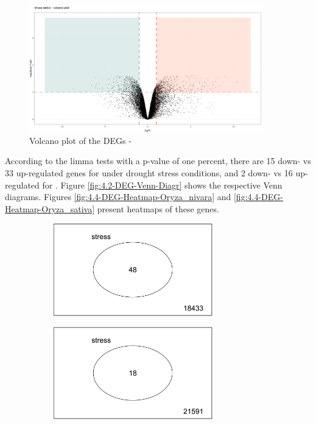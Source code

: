 \begin{figure}[htbp]
    \caption{Volcano plot of the DEGs - }
    \label{fig:4.1-DEG-Volcano-Plot-Oryza_sativa}
    \includegraphics[width=0.9\textwidth]{../../results/plots-and-tables/4.1-DEG-Volcano-Plot-Oryza_sativa}
\end{figure}

According to the limma tests with a p-value of one percent, there are 15 down- vs 33 up-regulated genes for  under drought stress conditions, and 2 down- vs 16 up-regulated for . Figure \ref{fig:4.2-DEG-Venn-Diagr} shows the respective Venn diagrams. Figures \ref{fig:4.4-DEG-Heatmap-Oryza_nivara} and \ref{fig:4.4-DEG-Heatmap-Oryza_sativa} present heatmaps of these genes.

\begin{figure}[htbp]
    \caption{Venn diagrams of the DEGs}
    \label{fig:4.2-DEG-Venn-Diagr}
    \begin{subfigure}[t]{0.44\linewidth}
        \caption{}
        \label{fig:4.2-DEG-Venn-Diagr-Oryza_nivara}
        \includegraphics[width=\textwidth, height=4cm]{../../results/plots-and-tables/4.2-DEG-Venn-Diagr-Oryza_nivara}
    \end{subfigure}
    \begin{subfigure}[t]{0.44\linewidth}
        \caption{}
        \label{fig:4.2-DEG-Venn-Diagr-Oryza_sativa}
        \includegraphics[width=\textwidth, height=4cm]{../../results/plots-and-tables/4.2-DEG-Venn-Diagr-Oryza_sativa}
    \end{subfigure}
\end{figure}

